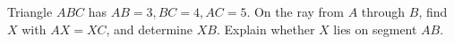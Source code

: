 Triangle $ABC$ has $AB=3,BC=4,AC=5$. On the ray from $A$ through $B$, find $X$ with $AX=XC$, and determine $XB$. Explain whether $X$ lies on segment $AB$.
